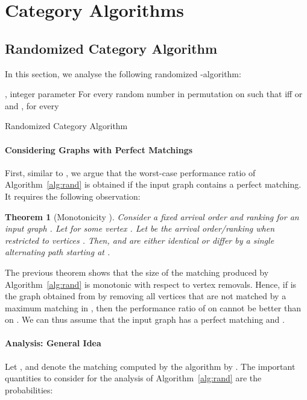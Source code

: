 \documentclass[a4paper]{article}
\newtheorem{theorem}{Theorem}
\begin{document}
\section{Category Algorithms} \label{sec:cat-algos}
\subsection{Randomized Category Algorithm} \label{sec:rand-cat}
In this section, we analyse the following randomized -algorithm:
\begin{algorithm}[H]
 \begin{algorithmic}
  \REQUIRE , integer parameter 
  \STATE For every  random number in 
  \STATE  permutation on  such that  iff
   or   and , for every 
  \RETURN 
 \end{algorithmic}
 \caption{Randomized Category Algorithm \label{alg:rand}}
\end{algorithm}


\paragraph*{Considering Graphs with Perfect Matchings}
First, similar to \cite{bm08}, we argue that the worst-case performance ratio of Algorithm~\ref{alg:rand} is obtained
if the input graph contains a perfect matching. It requires the following observation:

\begin{theorem}[Monotonicity \cite{gm08,kvv90}]
 Consider a fixed arrival order  and ranking  for an input graph .
 Let  for some vertex . Let  be the arrival order/ranking
 when restricted to vertices . Then,  and 
 are either identical or differ by a single alternating path starting at .
\end{theorem}
The previous theorem shows that the size of the matching produced by Algorithm~\ref{alg:rand} is monotonic
with respect to vertex removals. Hence, if  is the graph obtained from  by removing all vertices that are
not matched by a maximum matching in , then the performance ratio of  on  cannot be better than on .
We can thus assume that the input graph  has a perfect matching and .


\paragraph*{Analysis: General Idea}
Let , and denote the matching computed by the algorithm by .
The important quantities to consider for the analysis of Algorithm~\ref{alg:rand} are the probabilities:
\end{document}
